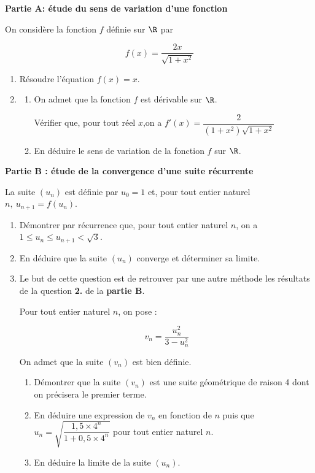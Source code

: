 \textbf{Partie A: étude du sens de variation d'une fonction}

\medskip

On considère la fonction $f$ définie sur $\R$ par 

\[f(x) = \dfrac{2x}{\sqrt{1 + x^2}}\]

\begin{enumerate}
\item Résoudre l'équation $f(x) = x$.
\item
	\begin{enumerate}
		\item On admet que la fonction $f$ est dérivable sur $\R$.
		
Vérifier que, pour tout réel $x$,on a $f'(x) = \dfrac{2}{(1+x^2)\sqrt{1 + x^2}}$
		\item En déduire le sens de variation de la fonction $f$ sur $\R$.
	\end{enumerate}
\end{enumerate}

\medskip

\textbf{Partie B : étude de la convergence d'une suite récurrente}

\medskip

La suite $(u_n)$ est définie par $u_0 = 1$ et, pour tout entier naturel $n,\: u_{n+1} = f(u_n)$.

\medskip

\begin{enumerate}
\item Démontrer par récurrence que, pour tout entier naturel $n$, on a $1 \leqslant u_n \leqslant u_{n+1} < \sqrt 3$.
\item En déduire que la suite $(u_n)$ converge et déterminer sa limite.
\item Le but de cette question est de retrouver par une autre méthode les résultats de la
question \textbf{2.} de la \textbf{partie B}.

Pour tout entier naturel $n$, on pose :

\[v_n = \dfrac{u_n^2}{3 - u_n^2}\]

On admet que la suite $(v_n)$ est bien définie.
	\begin{enumerate}
		\item Démontrer que la suite $(v_n)$ est une suite géométrique de raison 4 dont on précisera le premier terme.
		\item En déduire une expression de $v_n$ en fonction de $n$ puis que $u_n = \sqrt{\dfrac{1,5 \times 4^n}{1 + 0,5 \times 4^n}}$ pour tout entier naturel $n$.
		\item En déduire la limite de la suite $(u_n)$.
	\end{enumerate}
\end{enumerate}

